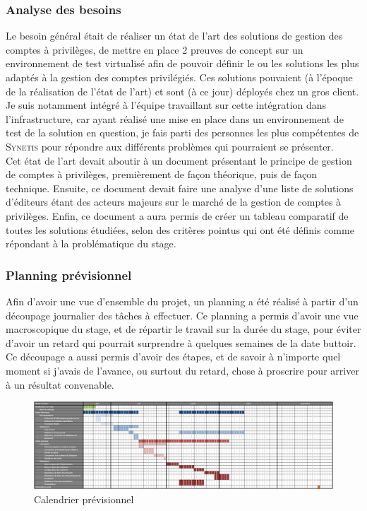 \subsubsection{Analyse des besoins}
\label{besoins}
Le besoin général était de réaliser un état de l'art des solutions de gestion des comptes à privilèges, de mettre en place 2 preuves de concept sur un environnement de test virtualisé afin de pouvoir définir le ou les solutions les plus adaptés à la gestion des comptes privilégiés. Ces solutions pouvaient (à l'époque de la réalisation de l'état de l'art) et sont (à ce jour) déployés chez un gros client. Je suis notamment intégré à l'équipe travaillant sur cette intégration dans l'infrastructure, car ayant réalisé une mise en place dans un environnement de test de la solution en question, je fais parti des personnes les plus compétentes de \textsc{Synetis} pour répondre aux différents problèmes qui pourraient se présenter.\\
Cet état de l'art devait aboutir à un document présentant le principe de gestion de comptes à privilèges, premièrement de façon théorique, puis de façon technique. Ensuite, ce document devait faire une analyse d'une liste de solutions d'éditeurs étant des acteurs majeurs sur le marché de la gestion de comptes à privilèges. Enfin, ce document a aura permis de créer un tableau comparatif de toutes les solutions étudiées, selon des critères pointus qui ont été définis comme répondant à la problématique du stage.

\subsubsection{Planning prévisionnel}
\label{planning}
Afin d'avoir une vue d'ensemble du projet, un planning a été réalisé à partir d'un découpage journalier des tâches à effectuer. Ce planning a permis d'avoir une vue macroscopique du stage, et de répartir le travail sur la durée du stage, pour éviter d'avoir un retard qui pourrait surprendre à quelques semaines de la date buttoir. Ce découpage a aussi permis d'avoir des étapes, et de savoir à n'importe quel moment si j'avais de l'avance, ou surtout du retard, chose à proscrire pour arriver à un résultat convenable.\\
\begin{figure}[!ht]
    \center
    \includegraphics[width=\textwidth]{./images/calendrier_previsionnel.png}
    \caption{Calendrier prévisionnel}
\end{figure}

